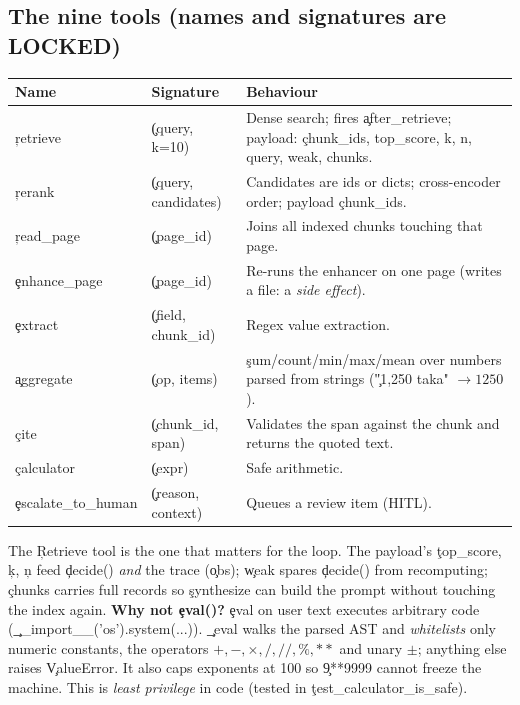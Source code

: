 \subsection{The nine tools (names and signatures are LOCKED)}
\begin{longtable}{@{}p{2.5cm}p{4cm}p{7.5cm}@{}}\toprule Name & Signature & Behaviour \\ \midrule \endhead
\c{retrieve} & \c{(query, k=10)} & Dense search; fires \c{after\_retrieve}; payload: \c{chunk\_ids, top\_score, k, n, query, weak, chunks}. \\
\c{rerank} & \c{(query, candidates)} & Candidates are ids or dicts; cross-encoder order; payload \c{chunk\_ids}. \\
\c{read\_page} & \c{(page\_id)} & Joins all indexed chunks touching that page. \\
\c{enhance\_page} & \c{(page\_id)} & Re-runs the enhancer on one page (writes a file: a \emph{side effect}). \\
\c{extract} & \c{(field, chunk\_id)} & Regex value extraction. \\
\c{aggregate} & \c{(op, items)} & \c{sum/count/min/max/mean} over numbers parsed from strings (\c{"1,250 taka"} $\to1250$). \\
\c{cite} & \c{(chunk\_id, span)} & Validates the span against the chunk and returns the quoted text. \\
\c{calculator} & \c{(expr)} & Safe arithmetic. \\
\c{escalate\_to\_human} & \c{(reason, context)} & Queues a review item (HITL). \\
\bottomrule\end{longtable}
The \c{Retrieve} tool is the one that matters for the loop. The payload's \c{top\_score}, \c{k}, \c{n} feed \c{decide()} \emph{and} the trace (\c{obs}); \c{weak} spares \c{decide()} from recomputing; \c{chunks} carries full records so \c{synthesize} can build the prompt without touching the index again.
\textbf{Why not \c{eval()}?} \c{eval} on user text executes arbitrary code (\c{\_\_import\_\_('os').system(...)}). \c{\_eval} walks the parsed AST and \emph{whitelists} only numeric constants, the operators $+,-,\times,/,//,\%,**$ and unary $\pm$; anything else raises \c{ValueError}. It also caps exponents at 100 so \c{9**9999} cannot freeze the machine. This is \emph{least privilege} in code (tested in \c{test\_calculator\_is\_safe}).

